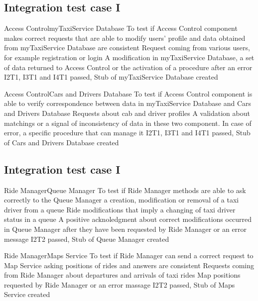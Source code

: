 
\subsection{Integration test case I}
\setcounter{testcounter}{1}
{Access Control\textrightarrow myTaxiService Database}
{To test if Access Control component makes correct requests that are able to modify users' profile and data obtained from myTaxiService Database are consistent}
{Request coming from various users, for example registration or login}
{A modification in myTaxiService Database, a set of data returned to Access Control or the activation of a procedure after an error}
{I2T1, I3T1 and I4T1 passed, Stub of myTaxiService Database created}

\vspace{2ex}
{Access Control\textrightarrow Cars and Drivers Database}
{To test if Access Control component is able to verify correspondence between data in myTaxiService Database and Cars and Drivers Database}
{Requests about cab and driver profiles}
{A validation about matchings or a signal of inconsistency of data in these two component. In case of error, a specific procedure that can manage it}
{I2T1, I3T1 and I4T1 passed, Stub of Cars and Drivers Database created}


\subsection{Integration test case I}
\setcounter{testcounter}{1}
{Ride Manager\textrightarrow Queue Manager}
{To test if Ride Manager methods are able to ask correctly to the Queue Manager a creation, modification or removal of a taxi driver from a queue}
{Ride modifications that imply a changing of taxi driver status in a queue}
{A positive acknoledgment about correct modifications occurred in Queue Manager after they have been requested by Ride Manager or an error message}
{I2T2 passed, Stub of Queue Manager created}

\vspace{2ex}
{Ride Manager\textrightarrow Maps Service}
{To test if Ride Manager can send a correct request to Map Service asking positions of rides and answers are consistent}
{Requests coming from Ride Manager about departures and arrivals of taxi rides}
{Map positions requested by Ride Manager or an error massage}
{I2T2 passed, Stub of Maps Service created}